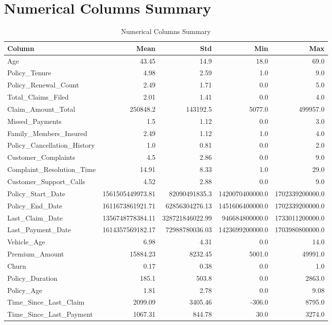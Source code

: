 \documentclass[a4paper,12pt]{article}
\begin{document}
\section{Numerical Columns Summary}

\begin{table}[h]
\centering
\begin{tabular}{lrrrr}
\toprule
Column & Mean & Std & Min & Max \\
\midrule
Age & 43.45 & 14.9 & 18.0 & 69.0 \\
Policy_Tenure & 4.98 & 2.59 & 1.0 & 9.0 \\
Policy_Renewal_Count & 2.49 & 1.71 & 0.0 & 5.0 \\
Total_Claims_Filed & 2.01 & 1.41 & 0.0 & 4.0 \\
Claim_Amount_Total & 250848.2 & 143192.5 & 5077.0 & 499957.0 \\
Missed_Payments & 1.5 & 1.12 & 0.0 & 3.0 \\
Family_Members_Insured & 2.49 & 1.12 & 1.0 & 4.0 \\
Policy_Cancellation_History & 1.0 & 0.81 & 0.0 & 2.0 \\
Customer_Complaints & 4.5 & 2.86 & 0.0 & 9.0 \\
Complaint_Resolution_Time & 14.91 & 8.33 & 1.0 & 29.0 \\
Customer_Support_Calls & 4.52 & 2.88 & 0.0 & 9.0 \\
Policy_Start_Date & 1561505449973.81 & 82090491835.3 & 1420070400000.0 & 1702339200000.0 \\
Policy_End_Date & 1611673861921.71 & 62856304276.13 & 1451606400000.0 & 1702339200000.0 \\
Last_Claim_Date & 1356748778384.11 & 328721846022.99 & 946684800000.0 & 1733011200000.0 \\
Last_Payment_Date & 1614357569182.17 & 72988780036.03 & 1423699200000.0 & 1703980800000.0 \\
Vehicle_Age & 6.98 & 4.31 & 0.0 & 14.0 \\
Premium_Amount & 15884.23 & 8232.45 & 5001.0 & 49991.0 \\
Churn & 0.17 & 0.38 & 0.0 & 1.0 \\
Policy_Duration & 185.1 & 503.8 & 0.0 & 2863.0 \\
Policy_Age & 1.81 & 2.78 & 0.0 & 9.08 \\
Time_Since_Last_Claim & 2099.09 & 3405.46 & -306.0 & 8795.0 \\
Time_Since_Last_Payment & 1067.31 & 844.78 & 30.0 & 3274.0 \\
\bottomrule
\end{tabular}
\caption{Numerical Columns Summary}
\label{tab:numerical_summary}
\end{table}
\end{document}
